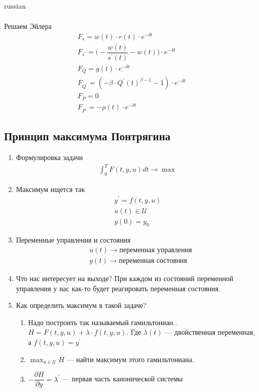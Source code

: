 \documentclass{article}
\begin{document}
\begin{otherlanguage*}{russian}
\begin{enumerate}
\begin{align*}
\end{align*}
Решаем Эйлера 
\begin{align*}
F_s = w(t) \cdot r(t) \cdot e^{-\delta t} \\
F_{s^{'}} = \Big( - \dfrac{w(t)}{s^{'}(t)} - w(t) \Big) \cdot e ^ {- \delta t} \\
F_Q = g(t) \cdot e^{- \delta t} \\
F_{Q^{'}} = ( - \beta \cdot Q^{'} (t) ^{\beta - 1} - 1 ) \cdot e ^ {- \delta t } \\
F_P = 0 \\
F_{P^{'}} = - \rho (t) \cdot e ^{- \delta t} 
\end{align*}
\end{enumerate}
\subsection*{Принцип максимума Понтрягина}
\begin{enumerate}
\item Формулировка задачи 
\begin{align*}
\int_0^T F(t, y, u ) dt \rightarrow \max 
\end{align*}
\item Максимум ищется так 
\begin{align*}
y^{'} = f(t, y, u) \\
u(t) \in \mathcal{U} \\
y(0) = y_0 
\end{align*}
\item Переменные управления и состояния 
\begin{align*}
&u(t) \rightarrow \text{переменная управления} \\
&y(t) \rightarrow \text{переменная состояния}
\end{align*}
\item Что нас интересует на выходе? При каждом из состояний переменной управления у нас как-то будет реагировать переменная состояния. 
\item Как определить максимум в такой задаче? 
\begin{enumerate}
\item Надо построить так называемый гамильтониан.. $ H = F(t, y, u ) + \lambda \cdot f(t, y, u) $. Где $\lambda(t) $ --- двойственная переменная, а $ f(t, y, u) = y^{'}  $
\item $ \max_{u \in \mathcal{U}} H $ --- найти максимум этого гамильтониана.
\item $ - \dfrac{\partial H}{\partial y} = \lambda^{'} $ --- первая часть канонической системы

\end{enumerate}
\end{enumerate}
\end{otherlanguage*}
\end{document}
